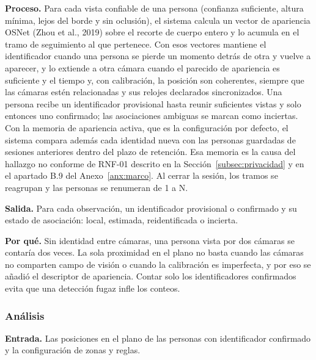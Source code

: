 \textbf{Proceso.} Para cada vista confiable de una persona (confianza suficiente, altura mínima,
lejos del borde y sin oclusión), el sistema calcula un vector de apariencia OSNet (Zhou et al.,
2019) sobre el recorte de cuerpo entero y lo acumula en el tramo de seguimiento al que
pertenece. Con esos vectores mantiene el identificador cuando una persona se pierde un
momento detrás de otra y vuelve a aparecer, y lo extiende a otra cámara cuando el parecido de
apariencia es suficiente y el tiempo y, con calibración, la posición son coherentes, siempre que
las cámaras estén relacionadas y sus relojes declarados sincronizados. Una persona recibe un
identificador provisional hasta reunir suficientes vistas y solo entonces uno confirmado; las
asociaciones ambiguas se marcan como inciertas. Con la memoria de apariencia activa, que es
la configuración por defecto, el sistema compara además cada identidad nueva con las
personas guardadas de sesiones anteriores dentro del plazo de retención. Esa memoria es la
causa del hallazgo no conforme de RNF-01 descrito en la Sección~\ref{subsec:privacidad} y en
el apartado B.9 del Anexo~\ref{anx:marco}. Al cerrar la sesión, los tramos se reagrupan y las
personas se renumeran de 1 a N.

\textbf{Salida.} Para cada observación, un identificador provisional o confirmado y su estado de
asociación: local, estimada, reidentificada o incierta.

\textbf{Por qué.} Sin identidad entre cámaras, una persona vista por dos cámaras se contaría dos
veces. La sola proximidad en el plano no basta cuando las cámaras no comparten campo de
visión o cuando la calibración es imperfecta, y por eso se añadió el descriptor de apariencia.
Contar solo los identificadores confirmados evita que una detección fugaz infle los conteos.

\subsubsection{Análisis}
\label{subsec:met-analisis}

\textbf{Entrada.} Las posiciones en el plano de las personas con identificador confirmado y la
configuración de zonas y reglas.

